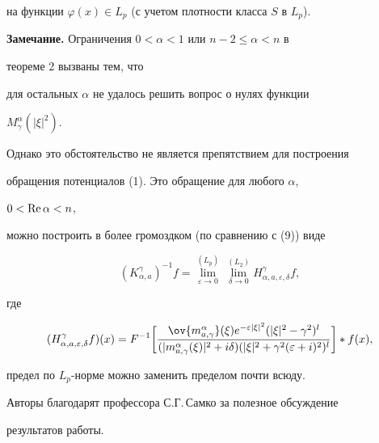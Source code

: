 на функции $\varphi(x)\in L_p$ (с учетом плотности класса $S$ в $L_p$). 


\medskip 


 


{\bf Замечание.} Ограничения $0<\alpha<1$ или $n-2\le\alpha<n$ в 


теореме 2 вызваны тем, что  


для остальных $\alpha$ не удалось решить вопрос о нулях функции 


$M^\alpha_\gamma(|\xi|^2)$. 


Однако это обстоятельство не является препятствием для построения  


обращения потенциалов (1). Это обращение для любого $\alpha$, 


$0<\operatorname{Re}\alpha<n$, 


можно построить в более громоздком (по сравнению с (9)) виде  


$$ 


(K^\gamma_{\alpha,a})^{-1}f= 


\overset{(L_p)}{\lim_{\varepsilon\to0}}{}\, 


\overset{(L_2)}{\lim_{\delta\to0}}{} 


H^\gamma_{\alpha,a,\varepsilon,\delta}f, 


$$ 


где 


$$ 


(H^\gamma_{\alpha,a,\varepsilon,\delta}f)(x)=F^{-1}\bigg[ 


\frac{\ov{m^\alpha_{a,\gamma}}(\xi) 


e^{-\varepsilon|\xi|^2}(|\xi|^2-\gamma^2)^l} 


{(|m^\alpha_{a,\gamma}(\xi)|^2+i\delta) 


(|\xi|^2+\gamma^2(\varepsilon+i)^2)^l}\bigg]* f(x), 


$$ 


предел по $L_p$-норме можно заменить пределом почти всюду. 


\medskip 


 


Авторы благодарят профессора С.Г.\,Самко за полезное обсуждение  


результатов работы. 


 


